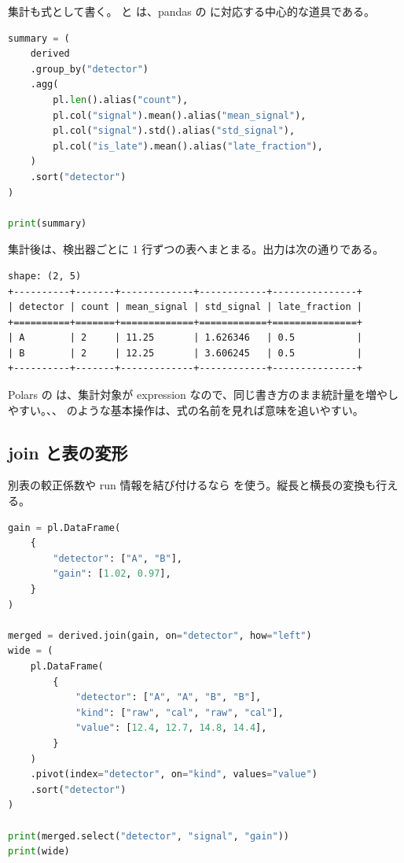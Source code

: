 集計も式として書く。 と  は、pandas の  に対応する中心的な道具である。

\begin{lstlisting}[language=Python]
summary = (
    derived
    .group_by("detector")
    .agg(
        pl.len().alias("count"),
        pl.col("signal").mean().alias("mean_signal"),
        pl.col("signal").std().alias("std_signal"),
        pl.col("is_late").mean().alias("late_fraction"),
    )
    .sort("detector")
)

print(summary)
\end{lstlisting}

集計後は、検出器ごとに 1 行ずつの表へまとまる。出力は次の通りである。

\begin{lstlisting}[numbers=none, xleftmargin=2\zw]
shape: (2, 5)
+----------+-------+-------------+------------+---------------+
| detector | count | mean_signal | std_signal | late_fraction |
+==========+=======+=============+============+===============+
| A        | 2     | 11.25       | 1.626346   | 0.5           |
| B        | 2     | 12.25       | 3.606245   | 0.5           |
+----------+-------+-------------+------------+---------------+
\end{lstlisting}

Polars の  は、集計対象が expression なので、同じ書き方のまま統計量を増やしやすい。、、 のような基本操作は、式の名前を見れば意味を追いやすい。

\subsection{join と表の変形}

別表の較正係数や run 情報を結び付けるなら  を使う。縦長と横長の変換も行える。

\begin{lstlisting}[language=Python]
gain = pl.DataFrame(
    {
        "detector": ["A", "B"],
        "gain": [1.02, 0.97],
    }
)

merged = derived.join(gain, on="detector", how="left")
wide = (
    pl.DataFrame(
        {
            "detector": ["A", "A", "B", "B"],
            "kind": ["raw", "cal", "raw", "cal"],
            "value": [12.4, 12.7, 14.8, 14.4],
        }
    )
    .pivot(index="detector", on="kind", values="value")
    .sort("detector")
)

print(merged.select("detector", "signal", "gain"))
print(wide)
\end{lstlisting}

